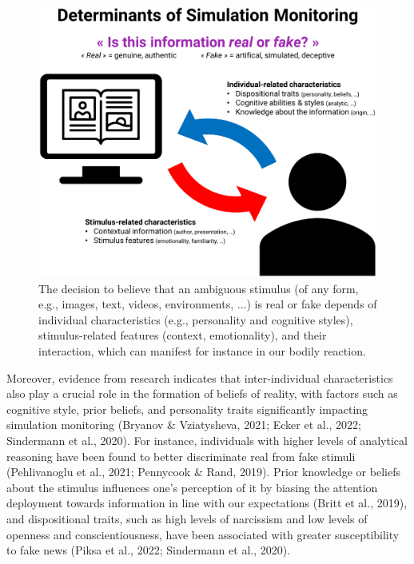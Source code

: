 \documentclass[
  man,floatsintext]{apa6}
\begin{document}
\begin{figure}
\includegraphics[width=1\linewidth]{../figures/Figure1} \caption{The decision to believe that an ambiguous stimulus (of any form, e.g., images, text, videos, environments, ...) is real or fake depends of individual characteristics (e.g., personality and cognitive styles), stimulus-related features (context, emotionality), and their interaction, which can manifest for instance in our bodily reaction.}\label{fig:unnamed-chunk-2}
\end{figure}

Moreover, evidence from research indicates that inter-individual characteristics also play a crucial role in the formation of beliefs of reality, with factors such as cognitive style, prior beliefs, and personality traits significantly impacting simulation monitoring (Bryanov \& Vziatysheva, 2021; Ecker et al., 2022; Sindermann et al., 2020). For instance, individuals with higher levels of analytical reasoning have been found to better discriminate real from fake stimuli (Pehlivanoglu et al., 2021; Pennycook \& Rand, 2019). Prior knowledge or beliefs about the stimulus influences one's perception of it by biasing the attention deployment towards information in line with our expectations (Britt et al., 2019), and dispositional traits, such as high levels of narcissism and low levels of openness and conscientiousness, have been associated with greater susceptibility to fake news (Piksa et al., 2022; Sindermann et al., 2020).
\end{document}
